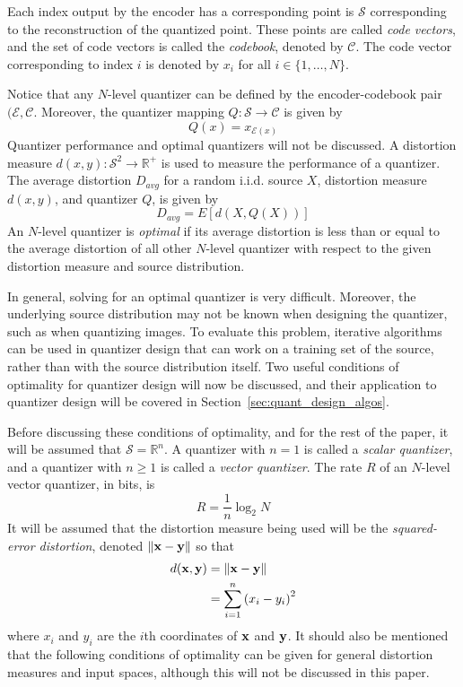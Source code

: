 \documentclass[10pt]{article}
\begin{document}
Each index output by the encoder has a corresponding point is $\mathcal{S}$ corresponding to the reconstruction of the quantized point. These points are called \emph{code vectors}, and the set of code vectors is called the \emph{codebook}, denoted by $\mathcal{C}$. The code vector corresponding to index $i$ is denoted by $x_i$ for all $i \in \{1,\ldots,N\}$.

Notice that any $N$-level quantizer can be defined by the encoder-codebook pair $(\mathcal{E}, \mathcal{C}$. Moreover, the quantizer mapping $Q : \mathcal{S} \rightarrow \mathcal{C}$ is given by
\begin{equation}
Q(x) = x_{\mathcal{E}(x)}
\end{equation}
Quantizer performance and optimal quantizers will not be discussed. A distortion measure $d(x,y) : \mathcal{S}^2 \rightarrow \mathbb{R}^+$ is used to measure the performance of a quantizer. The average distortion $D_{avg}$ for a random i.i.d. source $X$, distortion measure $d(x,y)$, and quantizer $Q$, is given by
\begin{equation}
  \label{eq_D_avg}
D_{avg} = E[d(X,Q(X))]
\end{equation}
An $N$-level quantizer is \emph{optimal} if its average distortion is less than or equal to the average distortion of all other $N$-level quantizer with respect to the given distortion measure and source distribution.

In general, solving for an optimal quantizer is very difficult. Moreover, the underlying source distribution may not be known when designing the quantizer, such as when quantizing images. To evaluate this problem, iterative algorithms can be used in quantizer design that can work on a training set of the source, rather than with the source distribution itself. Two useful conditions of optimality for quantizer design will now be discussed, and their application to quantizer design will be covered in Section~\ref{sec:quant_design_algos}.

Before discussing these conditions of optimality, and for the rest of the paper, it will be assumed that $\mathcal{S}=\mathbb{R}^n$. A quantizer with $n=1$ is called a \emph{scalar quantizer}, and a quantizer with $n \ge 1$ is called a \emph{vector quantizer}. The rate $R$ of an $N$-level vector quantizer, in bits, is
\begin{equation}
R = \frac{1}{n}\log_2 N
\end{equation}
It will be assumed that the distortion measure being used will be the \emph{squared-error distortion}, denoted ${\bf \| x - y \|}$ so that
\begin{align}
d(\bf x, \bf y) &= {\bf \| x - y \|} \\
&= \sum_{i=1}^n{(x_i - y_i)}^2
\end{align}
where $x_i$ and $y_i$ are the $i$th coordinates of $\bf x$ and $\bf y$. It should also be mentioned that the following conditions of optimality can be given for general distortion measures and input spaces, although this will not be discussed in this paper.
\end{document}
